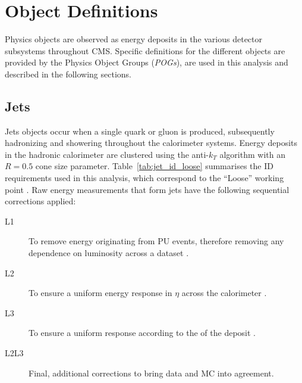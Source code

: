 \chapter{Object Definitions}
\label{ch:objects}

\ifpdf
    \graphicspath{{Chapter4/Figs/Raster/}{Chapter4/Figs/PDF/}{Chapter4/Figs/}}
\else
    \graphicspath{{Chapter4/Figs/Vector/}{Chapter4/Figs/}}
\fi



Physics objects are observed as energy deposits in the various detector 
subsystems throughout CMS. Specific definitions for the different 
objects are provided by the Physics Object Groups (\emph{POGs}), are used in
this analysis and described in the following sections.


\section{Jets}  %
\label{sec:objects_jets}

Jets objects occur when a single quark or gluon is produced, subsequently 
hadronizing and showering throughout the calorimeter systems. Energy deposits in
the hadronic calorimeter are clustered using the anti-$k_T$ algorithm \cite{antikt} with
an $R=0.5$ cone size parameter.
Table~\ref{tab:jet_id_loose} summarises the ID requirements used in this 
analysis, which correspond to the ``Loose'' working point \cite{ref:jet-id}.
Raw energy measurements that form jets have the following sequential
corrections \cite{ref:jet-jes, 2011JInst...611002C} applied:
\begin{description}
\item[L1] To remove energy originating from PU events, therefore removing any
dependence on luminosity across a dataset \cite{Cacciari2008119, 1126-6708-2008-04-005}.
\item[L2] To ensure a uniform energy response in $\eta$ across the calorimeter \cite{Chatrchyan:2011ds}.
\item[L3] To ensure a uniform response according to the \Pt of the deposit \cite{Chatrchyan:2011ds}.
\item[L2L3] Final, additional corrections to bring data and MC into agreement.
\end{description}


